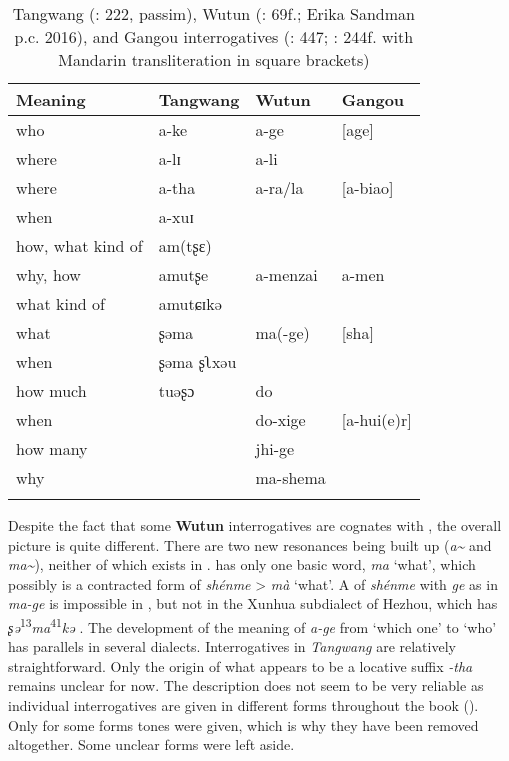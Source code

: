 \begin{table}
\caption{Tangwang (\citealt{Xu2014}: 222, passim), Wutun (\citealt{Janhunen2008}: 69f.; Erika Sandman p.c. 2016), and Gangou interrogatives (\citealt{ZhuYongzhong1997}: 447; \citealt{YangYonglong2014}: 244f. with Mandarin transliteration in square brackets)}
\label{tab:trans:10}

\begin{tabularx}{\textwidth}{XXXl}
\lsptoprule

\textbf{Meaning} & \textbf{Tangwang} & \textbf{Wutun} & \textbf{Gangou}\\
\midrule
who & a-ke & a-ge & [age]\\
where & a-lɪ & a-li & \\
where & a-tha & a-ra/la & [a-biao]\\
when & a-xuɪ &  & \\
how, what kind of & am(tʂɛ) &  & \\
why, how & amutʂe & a-menzai & a-men\\
what kind of & amutɕɪkə &  & \\
what & ʂəma & ma(-ge) & [sha]\\
when & ʂəma ʂʅxəu &  & \\
how much & tuəʂɔ & do & \\
when &  & do-xige & [a-hui(e)r] \\
how many &  & jhi-ge & \\
why &  & ma-shema & \\
\lspbottomrule
\end{tabularx}
\end{table}

Despite the fact that some \textbf{Wutun} interrogatives are cognates with , the overall picture is quite different. There are two new resonances being built up (\textit{a{\textasciitilde}} and \textit{ma{\textasciitilde}}), neither of which exists in .  has only one basic  word, \textit{ma} ‘what’, which possibly is a contracted form of  \textit{shénme}  > \textit{mà}  ‘what’. A  of \textit{shénme}  with \textit{ge}  as in  \textit{ma-ge} is impossible in , but not in the Xunhua subdialect of Hezhou, which has \textit{ʂə}\textsuperscript{13}\textit{ma}\textsuperscript{41}\textit{kə} . The development of the meaning of  \textit{a-ge} from ‘which one’ to ‘who’ has parallels in several  dialects. Interrogatives in \textit{Tangwang} are relatively straightforward. Only the origin of what appears to be a locative suffix \textit{-tha} remains unclear for now. The description does not seem to be very reliable as individual interrogatives are given in different forms throughout the book (\citealt{Xu2014}). Only for some forms tones were given, which is why they have been removed altogether. Some unclear forms were left aside.

